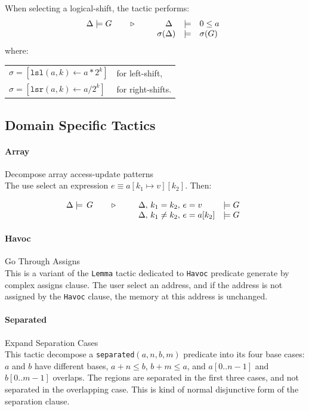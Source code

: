 When selecting a logical-shift, the tactic performs:
\[\TACTIC{\Delta\models G}{%
\begin{array}[t]{rcl}
\Delta\phantom{)} &\models& 0 \leq a \\
\sigma(\Delta) &\models& \sigma(G)
\end{array}
}\]
where:
\begin{tabular}[t]{ll}
$\sigma = [ \mathtt{lsl}(a,k) \leftarrow a * 2^k ]$ &
for left-shift, \\
$\sigma = [ \mathtt{lsr}(a,k) \leftarrow a / 2^k ]$ &
for right-shifts.
\end{tabular}

\subsection{Domain Specific Tactics}

\paragraph{Array} Decompose array access-update patterns\\
The use select an expression $e\equiv a[k_1\mapsto v][k_2]$. Then:

\[
\TACTIC{\Delta\models\,G}{%
\begin{array}[t]{ll}
\Delta,\,k_1=k_2,\,e = v &\models G \\
\Delta,\,k_1\neq k_2,\,e = a[k_2] &\models G
\end{array}
}\]

\paragraph{Havoc} Go Through Assigns \\
This is a variant of the \texttt{Lemma} tactic dedicated to \texttt{Havoc}
predicate generate by complex assigns clause. The user select an address, and
if the address is not assigned by the \texttt{Havoc} clause, the memory at this
address is unchanged.

\paragraph{Separated} Expand Separation Cases\\
This tactic decompose a \texttt{separated}$(a,n,b,m)$ predicate into its four base cases: $a$ and $b$ have different bases, $a+n \leq b$, $b+m \leq a$, and $a[0..n-1]$ and $b[0..m-1]$ overlaps. The regions are separated in the first three cases, and not separated in the overlapping case. This is kind of normal disjunctive form of the separation clause.


